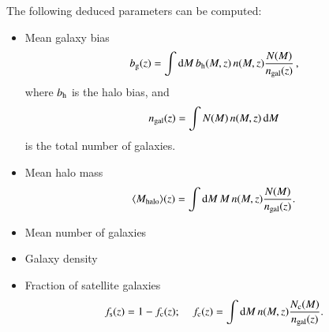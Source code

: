 \documentclass[11pt, chapterprefix, headsepline]{scrartcl}
\newcommand{\ud}{\mathrm{d}}
\begin{document}
The following deduced parameters can be computed:

\begin{itemize}

\item Mean galaxy bias
% 
\begin{equation}
  \label{eq:bias}
  b_{\rm g}(z) = \int \ud M \, b_{\rm
    h}(M, z)
  \, n(M, z) \frac{N(M)}{n_{\rm gal}(z)} \, ,
\end{equation}
%
where $b_{\rm h}$ is the halo bias, and
%
\begin{equation}
  \label{eq:ngal}
  n_{\rm gal}(z) = \int N(M) \, n(M,z) \, \ud M
\end{equation}
is the total
number of galaxies.


\item Mean halo mass
%
  \begin{equation}
    \label{eq:Mhalo}
    \langle M_{\rm halo} \rangle (z) = \int \ud M \, M \, n(M, z)
    \frac{N(M)}{n_{\rm gal}(z)}.
  \end{equation}
%

\item Mean number of galaxies
%

\item Galaxy density
%

\item Fraction of satellite galaxies
  \begin{equation}
    \label{eq:fsat}
    f_{\rm s}(z) = 1 - f_{\rm c}(z); \;\;\;\;
    f_{\rm c}(z) = \int \ud M \, n(M, z)
    \frac{N_{\rm c} (M)}{n_{\rm gal}(z)}.
  \end{equation}

\end{itemize}
\end{document}
